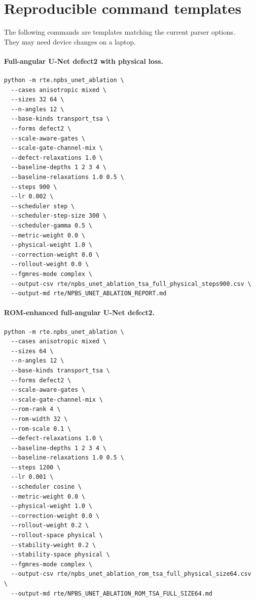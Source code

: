 \documentclass[11pt]{article}
\begin{document}
\section{Reproducible command templates}

The following commands are templates matching the current parser options.  They
may need device changes on a laptop.

\paragraph{Full-angular U-Net defect2 with physical loss.}
\begin{verbatim}
python -m rte.npbs_unet_ablation \
  --cases anisotropic mixed \
  --sizes 32 64 \
  --n-angles 12 \
  --base-kinds transport_tsa \
  --forms defect2 \
  --scale-aware-gates \
  --scale-gate-channel-mix \
  --defect-relaxations 1.0 \
  --baseline-depths 1 2 3 4 \
  --baseline-relaxations 1.0 0.5 \
  --steps 900 \
  --lr 0.002 \
  --scheduler step \
  --scheduler-step-size 300 \
  --scheduler-gamma 0.5 \
  --metric-weight 0.0 \
  --physical-weight 1.0 \
  --correction-weight 0.0 \
  --rollout-weight 0.0 \
  --fgmres-mode complex \
  --output-csv rte/npbs_unet_ablation_tsa_full_physical_steps900.csv \
  --output-md rte/NPBS_UNET_ABLATION_REPORT.md
\end{verbatim}

\paragraph{ROM-enhanced full-angular U-Net defect2.}
\begin{verbatim}
python -m rte.npbs_unet_ablation \
  --cases anisotropic mixed \
  --sizes 64 \
  --n-angles 12 \
  --base-kinds transport_tsa \
  --forms defect2 \
  --scale-aware-gates \
  --scale-gate-channel-mix \
  --rom-rank 4 \
  --rom-width 32 \
  --rom-scale 0.1 \
  --defect-relaxations 1.0 \
  --baseline-depths 1 2 3 4 \
  --baseline-relaxations 1.0 0.5 \
  --steps 1200 \
  --lr 0.001 \
  --scheduler cosine \
  --metric-weight 0.0 \
  --physical-weight 1.0 \
  --correction-weight 0.0 \
  --rollout-weight 0.2 \
  --rollout-space physical \
  --stability-weight 0.2 \
  --stability-space physical \
  --fgmres-mode complex \
  --output-csv rte/npbs_unet_ablation_rom_tsa_full_physical_size64.csv \
  --output-md rte/NPBS_UNET_ABLATION_ROM_TSA_FULL_SIZE64.md
\end{verbatim}
\end{document}
